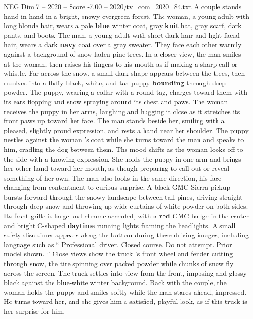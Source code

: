 \begin{textsample}{NEG Dim 7 – 2020 – Score -7.00 – 2020/tv\_com\_2020\_84.txt}  \label{ex:f7_neg_002}
A couple stands hand in hand in a bright, snowy evergreen forest.
The woman, a young adult with long blonde hair, wears a pale \textbf{blue} winter coat, gray \textbf{knit} hat, gray scarf, dark pants, and boots.
The man, a young adult with short dark hair and light facial hair, wears a dark \textbf{navy} coat over a gray sweater.
They face each other warmly against a background of snow-laden pine trees.
In a closer view, the man smiles at the woman, then raises his fingers to his mouth as if making a sharp call or whistle.
Far across the snow, a small dark shape appears between the trees, then resolves into a fluffy black, white, and tan puppy \textbf{bounding} through deep powder.
The puppy, wearing a collar with a round tag, charges toward them with its ears flopping and snow spraying around its chest and paws.
The woman receives the puppy in her arms, laughing and hugging it close as it stretches its front paws up toward her face.
The man stands beside her, smiling with a pleased, slightly proud expression, and rests a hand near her shoulder.
The puppy nestles against the woman ’s coat while she turns toward the man and speaks to him, cradling the dog between them.
The mood shifts as the woman looks off to the side with a knowing expression.
She holds the puppy in one arm and brings her other hand toward her mouth, as though preparing to call out or reveal something of her own.
The man also looks in the same direction, his face changing from contentment to curious surprise.
A black GMC Sierra pickup bursts forward through the snowy landscape between tall pines, driving straight through deep snow and throwing up wide curtains of white powder on both sides.
Its front grille is large and chrome-accented, with a \textbf{red} GMC badge in the center and bright C-shaped \textbf{daytime} running lights framing the headlights.
A small safety disclaimer appears along the bottom during these driving images, including language such as “ Professional driver.
Closed course.
Do not attempt.
Prior model shown. ” Close views show the truck ’s front wheel and fender cutting through snow, the tire spinning over packed powder while chunks of snow fly across the screen.
The truck settles into view from the front, imposing and glossy black against the blue-white winter background.
Back with the couple, the woman holds the puppy and smiles softly while the man stares ahead, impressed.
He turns toward her, and she gives him a satisfied, playful look, as if this truck is her surprise for him.

\end{textsample}
